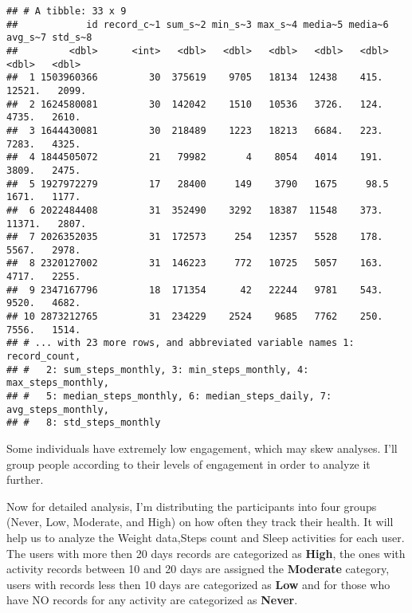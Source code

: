 \documentclass[
]{article}
\begin{document}
\begin{verbatim}
## # A tibble: 33 x 9
##            id record_c~1 sum_s~2 min_s~3 max_s~4 media~5 media~6 avg_s~7 std_s~8
##         <dbl>      <int>   <dbl>   <dbl>   <dbl>   <dbl>   <dbl>   <dbl>   <dbl>
##  1 1503960366         30  375619    9705   18134  12438    415.   12521.   2099.
##  2 1624580081         30  142042    1510   10536   3726.   124.    4735.   2610.
##  3 1644430081         30  218489    1223   18213   6684.   223.    7283.   4325.
##  4 1844505072         21   79982       4    8054   4014    191.    3809.   2475.
##  5 1927972279         17   28400     149    3790   1675     98.5   1671.   1177.
##  6 2022484408         31  352490    3292   18387  11548    373.   11371.   2807.
##  7 2026352035         31  172573     254   12357   5528    178.    5567.   2978.
##  8 2320127002         31  146223     772   10725   5057    163.    4717.   2255.
##  9 2347167796         18  171354      42   22244   9781    543.    9520.   4682.
## 10 2873212765         31  234229    2524    9685   7762    250.    7556.   1514.
## # ... with 23 more rows, and abbreviated variable names 1: record_count,
## #   2: sum_steps_monthly, 3: min_steps_monthly, 4: max_steps_monthly,
## #   5: median_steps_monthly, 6: median_steps_daily, 7: avg_steps_monthly,
## #   8: std_steps_monthly
\end{verbatim}

Some individuals have extremely low engagement, which may skew analyses.
I'll group people according to their levels of engagement in order to
analyze it further.

Now for detailed analysis, I'm distributing the participants into four
groups (Never, Low, Moderate, and High) on how often they track their
health. It will help us to analyze the Weight data,Steps count and Sleep
activities for each user. The users with more then 20 days records are
categorized as \textbf{High}, the ones with activity records between 10
and 20 days are assigned the \textbf{Moderate} category, users with
records less then 10 days are categorized as \textbf{Low} and for those
who have NO records for any activity are categorized as \textbf{Never}.
\end{document}
